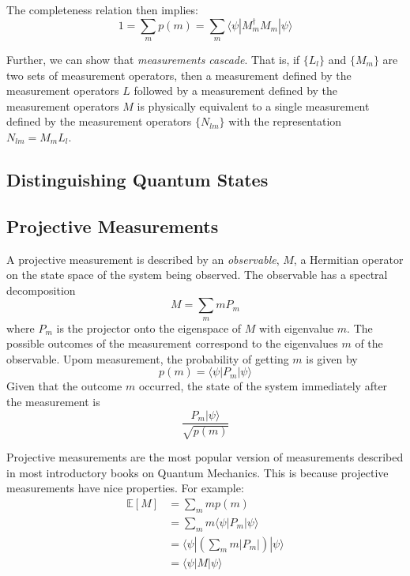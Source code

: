 The completeness relation then implies:
\begin{equation*}
    1 = \sum_m p(m) = \sum_m\langle\psi|M_m^\dagger M_m|\psi\rangle
\end{equation*}

Further, we can show that \textit{measurements cascade}. That is, if $\{L_l\}$ and $\{M_m\}$ are two sets of measurement operators, then a measurement defined by the measurement operators $L$ followed by a measurement defined by the measurement operators $M$ is physically equivalent to a single measurement defined by the measurement operators $\{N_{lm}\}$ with the representation $N_{lm} = M_mL_l$.

\subsection*{Distinguishing Quantum States}
\subsection*{Projective Measurements}
\begin{definition}
    A projective measurement is described by an \textit{observable}, $M$, a Hermitian operator on the state space of the system being observed. The observable has a spectral decomposition 
    \begin{equation*}
        M = \sum_m mP_m
    \end{equation*}
    where $P_m$ is the projector onto the eigenspace of $M$ with eigenvalue $m$. The possible outcomes of the measurement correspond to the eigenvalues $m$ of the observable. Upom measurement, the probability of getting $m$ is given by 
    \begin{equation*}
        p(m) = \langle\psi|P_m|\psi\rangle
    \end{equation*}
    Given that the outcome $m$ occurred, the state of the system immediately after the measurement is 
    \begin{equation*}
        \frac{P_m|\psi\rangle}{\sqrt{p(m)}}
    \end{equation*}
\end{definition}

Projective measurements are the most popular version of measurements described in most introductory books on Quantum Mechanics. This is because projective measurements have nice properties. For example:
\begin{align*}
    \mathbb{E}[M] &= \sum_m mp(m)\\
    &= \sum_m m\langle\psi|P_m|\psi\rangle\\
    &= \langle\psi|\left(\sum_m m|P_m|\right)|\psi\rangle\\
    &= \langle\psi|M|\psi\rangle
\end{align*}

